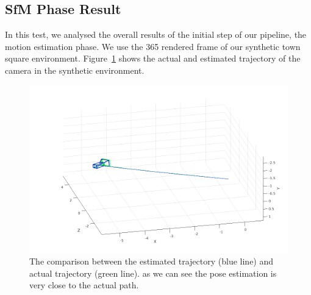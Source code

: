 \subsection{SfM Phase Result}
In this test, we analysed the overall results of the initial step of our
pipeline, the motion estimation phase. We use the 365 rendered frame of our
synthetic town square environment. Figure~\ref{fig:trajectory} shows the actual
and estimated trajectory of the camera in the synthetic environment.
%
%
\begin{figure}[h]
\centering
\includegraphics[width=\linewidth]{img/trajectory.png}
\caption{The comparison between the estimated trajectory (blue line) and
actual trajectory (green line). as we can see the pose estimation is very close
to the actual path.}
\label{fig:trajectory}
\end{figure}
%
